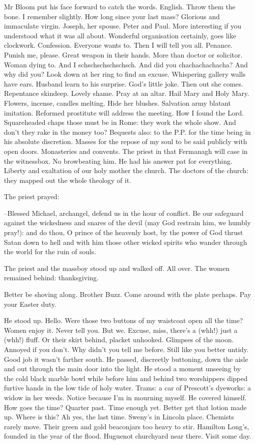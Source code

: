Mr Bloom put his face forward to catch the words. English. Throw
them the bone. I remember slightly. How long since your last mass?
Glorious and immaculate virgin. Joseph, her spouse. Peter and Paul. More
interesting if you understood what it was all about. Wonderful
organisation certainly, goes like clockwork. Confession. Everyone wants
to. Then I will tell you all. Penance. Punish me, please. Great weapon in
their hands. More than doctor or solicitor. Woman dying to. And I
schschschschschsch. And did you chachachachacha? And why did you? Look
down at her ring to find an excuse. Whispering gallery walls have ears.
Husband learn to his surprise. God's little joke. Then out she comes.
Repentance skindeep. Lovely shame. Pray at an altar. Hail Mary and
Holy Mary. Flowers, incense, candles melting. Hide her blushes.
Salvation army blatant imitation. Reformed prostitute will address
the meeting. How I found the Lord. Squareheaded chaps those must be
in Rome: they work the whole show. And don't they rake in the money too?
Bequests also: to the P.P. for the time being in his absolute discretion.
Masses for the repose of my soul to be said publicly with open doors.
Monasteries and convents. The priest in that Fermanagh will case in
the witnessbox. No browbeating him. He had his answer pat for everything.
Liberty and exaltation of our holy mother the church. The doctors of the
church: they mapped out the whole theology of it.

The priest prayed:

--Blessed Michael, archangel, defend us in the hour of conflict. Be our
safeguard against the wickedness and snares of the devil (may God restrain
him, we humbly pray!): and do thou, O prince of the heavenly host, by the
power of God thrust Satan down to hell and with him those other wicked
spirits who wander through the world for the ruin of souls.

The priest and the massboy stood up and walked off. All over. The
women remained behind: thanksgiving.

Better be shoving along. Brother Buzz. Come around with the plate
perhaps. Pay your Easter duty.

He stood up. Hello. Were those two buttons of my waistcoat open all
the time? Women enjoy it. Never tell you. But we. Excuse, miss, there's a
(whh!) just a (whh!) fluff. Or their skirt behind, placket unhooked.
Glimpses of the moon. Annoyed if you don't. Why didn't you tell me
before. Still like you better untidy. Good job it wasn't farther south. He
passed, discreetly buttoning, down the aisle and out through the main door
into the light. He stood a moment unseeing by the cold black marble bowl
while before him and behind two worshippers dipped furtive hands in the
low tide of holy water. Trams: a car of Prescott's dyeworks: a widow in
her  weeds. Notice because I'm in mourning myself. He covered himself. How
goes the time? Quarter past. Time enough yet. Better get that lotion made
up. Where is this? Ah yes, the last time. Sweny's in Lincoln place.
Chemists rarely move. Their green and gold beaconjars too heavy to stir.
Hamilton Long's, founded in the year of the flood. Huguenot churchyard
near there. Visit some day.

